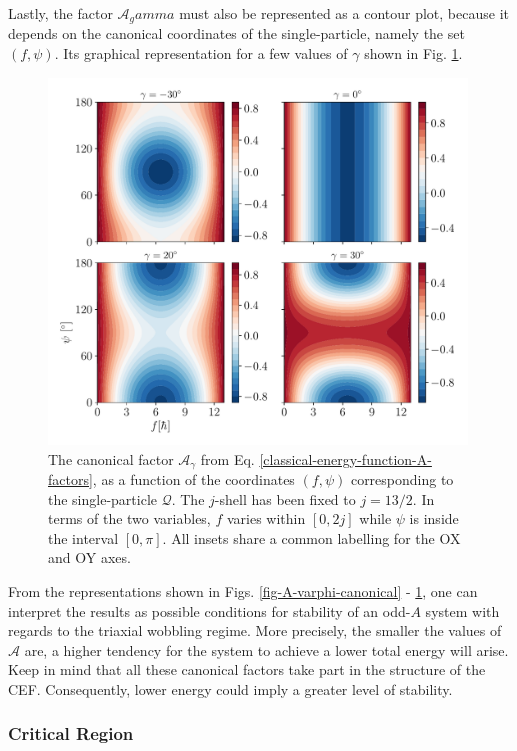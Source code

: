 Lastly, the factor $\mathcal{A}_gamma$ must also be represented as a contour plot, because it depends on the canonical coordinates of the single-particle, namely the set $(f,\psi)$. Its graphical representation for a few values of $\gamma$ shown in Fig. \ref{fig-A-gamma-canonical}.
\begin{figure}
    \centering
    \includegraphics[width=0.99\textwidth]{Chapters/Figures/A_gamma.pdf}
    \caption{The canonical factor $\mathcal{A}_\gamma$ from Eq. \ref{classical-energy-function-A-factors}, as a function of the coordinates $(f,\psi)$ corresponding to the single-particle $\mathcal{Q}$. The $j$-shell has been fixed to $j=13/2$. In terms of the two variables, $f$ varies within $[0,2j]$ while $\psi$ is inside the interval $[0,\pi]$. All insets share a common labelling for the OX and OY axes.}
    \label{fig-A-gamma-canonical}
\end{figure}

From the representations shown in Figs. \ref{fig-A-varphi-canonical} - \ref{fig-A-gamma-canonical}, one can interpret the results as possible conditions for stability of an odd-$A$ system with regards to the triaxial wobbling regime. More precisely, the smaller the values of $\mathcal{A}$ are, a higher tendency for the system to achieve a lower total energy will arise. Keep in mind that all these canonical factors take part in the structure of the CEF. Consequently, lower energy could imply a greater level of stability.

\subsubsection{Critical Region}

